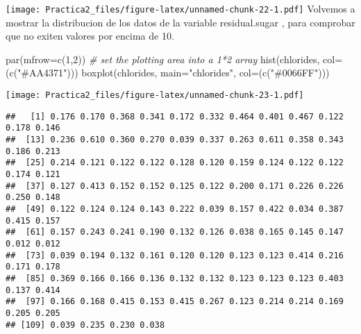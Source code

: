 \documentclass[
]{article}
\newenvironment{Shaded}{\begin{snugshade}}{\end{snugshade}}
\newcommand{\AttributeTok}[1]{\textcolor[rgb]{0.77,0.63,0.00}{#1}}
\newcommand{\CommentTok}[1]{\textcolor[rgb]{0.56,0.35,0.01}{\textit{#1}}}
\newcommand{\DecValTok}[1]{\textcolor[rgb]{0.00,0.00,0.81}{#1}}
\newcommand{\FunctionTok}[1]{\textcolor[rgb]{0.00,0.00,0.00}{#1}}
\newcommand{\NormalTok}[1]{#1}
\newcommand{\SpecialCharTok}[1]{\textcolor[rgb]{0.00,0.00,0.00}{#1}}
\newcommand{\StringTok}[1]{\textcolor[rgb]{0.31,0.60,0.02}{#1}}
\begin{document}
\begin{Shaded}
\end{Shaded}

\texttt{[image: Practica2\_files/figure-latex/unnamed-chunk-22-1.pdf]}
Volvemos a mostrar la distribucion de los datos de la variable
residual.sugar , para comprobar que no exiten valores por encima de 10.

\begin{Shaded}
\begin{Highlighting}[]
\FunctionTok{par}\NormalTok{(}\AttributeTok{mfrow=}\FunctionTok{c}\NormalTok{(}\DecValTok{1}\NormalTok{,}\DecValTok{2}\NormalTok{))    }\CommentTok{\# set the plotting area into a 1*2 array}
\FunctionTok{hist}\NormalTok{(chlorides, }\AttributeTok{col=}\NormalTok{(}\FunctionTok{c}\NormalTok{(}\StringTok{"\#AA4371"}\NormalTok{)))}
\FunctionTok{boxplot}\NormalTok{(chlorides, }\AttributeTok{main=}\StringTok{"chlorides"}\NormalTok{, }\AttributeTok{col=}\NormalTok{(}\FunctionTok{c}\NormalTok{(}\StringTok{"\#0066FF"}\NormalTok{)))}
\end{Highlighting}
\end{Shaded}

\texttt{[image: Practica2\_files/figure-latex/unnamed-chunk-23-1.pdf]}

\begin{Shaded}
\end{Shaded}

\begin{verbatim}
##   [1] 0.176 0.170 0.368 0.341 0.172 0.332 0.464 0.401 0.467 0.122 0.178 0.146
##  [13] 0.236 0.610 0.360 0.270 0.039 0.337 0.263 0.611 0.358 0.343 0.186 0.213
##  [25] 0.214 0.121 0.122 0.122 0.128 0.120 0.159 0.124 0.122 0.122 0.174 0.121
##  [37] 0.127 0.413 0.152 0.152 0.125 0.122 0.200 0.171 0.226 0.226 0.250 0.148
##  [49] 0.122 0.124 0.124 0.143 0.222 0.039 0.157 0.422 0.034 0.387 0.415 0.157
##  [61] 0.157 0.243 0.241 0.190 0.132 0.126 0.038 0.165 0.145 0.147 0.012 0.012
##  [73] 0.039 0.194 0.132 0.161 0.120 0.120 0.123 0.123 0.414 0.216 0.171 0.178
##  [85] 0.369 0.166 0.166 0.136 0.132 0.132 0.123 0.123 0.123 0.403 0.137 0.414
##  [97] 0.166 0.168 0.415 0.153 0.415 0.267 0.123 0.214 0.214 0.169 0.205 0.205
## [109] 0.039 0.235 0.230 0.038
\end{verbatim}
\end{document}
